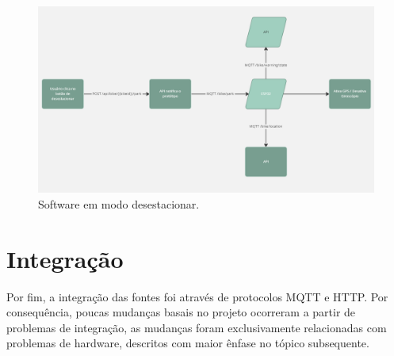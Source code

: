 \begin{figure}[!h]
\centering
\includegraphics[width=15cm]{capitulos/Figuras/Software_Desestacionar.png}
\caption{Software em modo desestacionar.}
\label{fig:unpark-bike}
\end{figure}

\newpage
\section{Integração}
Por fim, a integração das fontes foi através de protocolos MQTT e HTTP. Por consequência, poucas mudanças basais no projeto ocorreram a partir de problemas de integração, as mudanças foram exclusivamente relacionadas com problemas de hardware, descritos com maior ênfase no tópico subsequente.